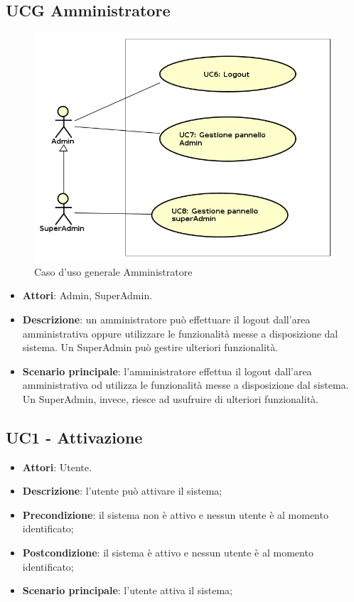 \documentclass[../AnalisiDeiRequisiti_v3.0.0.tex]{subfiles}
\begin{document}
\subsection{UCG Amministratore} 
\label{sssec:UCG_Admin} 
\begin{figure}[!h]
	\centering
	\includegraphics[width=\textwidth]{UseCases/UCG_Amministratore/UCG_Amministratore.png}
	\caption{Caso d'uso generale Amministratore}
\end{figure}
\begin{itemize} 
\item \textbf{Attori}: Admin, SuperAdmin.
\item \textbf{Descrizione}: un amministratore può effettuare il logout dall'area amministrativa oppure utilizzare le funzionalità messe a disposizione dal sistema. Un SuperAdmin può gestire ulteriori funzionalità.
\item \textbf{Scenario principale}: l'amministratore effettua il logout dall'area amministrativa od utilizza le funzionalità messe a disposizione dal sistema. Un SuperAdmin, invece, riesce ad usufruire di ulteriori funzionalità.
\end{itemize}
\newpage
\subsection{UC1 - Attivazione} 
\label{sssec:UC1}
\begin{itemize} 
\item \textbf{Attori}: Utente.
\item \textbf{Descrizione}: l'utente può attivare il sistema;
\item \textbf{Precondizione}: il sistema non è attivo e nessun utente è al momento identificato;
\item \textbf{Postcondizione}: il sistema è attivo e nessun utente è al momento identificato;
\item \textbf{Scenario principale}: l'utente attiva il sistema;
\end{itemize} 
\end{document}
